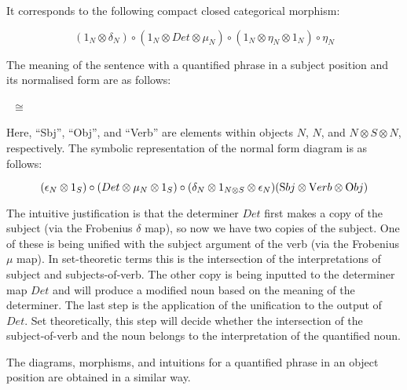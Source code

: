 \documentclass[a4paper,11pt]{easychair}
\begin{document}
\begin{center}
\end{center}

\noindent
It corresponds to the following compact closed categorical morphism:

\[
(1_N \otimes \delta_N) \circ (1_N \otimes Det \otimes \mu_N) \circ (1_N \otimes \eta_N \otimes 1_N) \circ \eta_N
\]

The meaning of the sentence with a quantified phrase in a subject position and its normalised form are
as follows:

\begin{minipage}{20cm}
\begin{minipage}{7cm}
\end{minipage}
\ $\cong$ \ \qquad
\begin{minipage}{5cm}
\end{minipage}
\end{minipage}

\noindent
Here,  ``Sbj'', ``Obj'', and  ``Verb'' are elements within objects $N$, $N$, and $N \otimes S \otimes N$, respectively.  The symbolic representation of the normal form diagram is as follows:

\[
(\epsilon_N \otimes 1_S) \circ (Det \otimes \mu_N \otimes 1_S) \circ (\delta_N \otimes 1_{N \otimes S} \otimes \epsilon_N)( {\text Sbj} \otimes  {\text Verb} \otimes  {\text Obj})
\] 

\noindent
The intuitive justification is that the determiner $Det$  first makes a copy of the subject (via the Frobenius $\delta$
map), so now we have two copies of the subject. One of these is being unified with the subject argument
of the verb (via the Frobenius $\mu$ map). In set-theoretic terms this is the intersection of the interpretations
of subject and subjects-of-verb. The other copy is being inputted to the determiner map $Det$ and will
produce a modified noun based on the meaning of the determiner. The last step is the application of the
unification to the output of $Det$. Set theoretically, this step will decide whether the intersection of the
subject-of-verb and the noun belongs to the interpretation of the quantified noun.


The diagrams, morphisms, and intuitions for a quantified phrase in an object position are obtained in a similar way.
\end{document}
